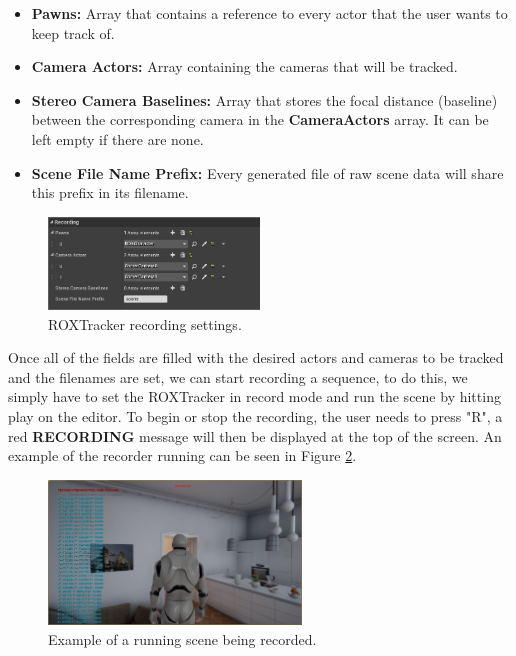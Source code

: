 \begin{itemize}
	\item \textbf{Pawns:} Array that contains a reference to every actor that the user wants to keep track of.
	\item \textbf{Camera Actors:} Array containing the cameras that will be tracked.
	\item \textbf{Stereo Camera Baselines:} Array that stores the focal distance (baseline) between the corresponding camera in the \textbf{CameraActors} array. It can be left empty if there are none.
	\item \textbf{Scene File Name Prefix:} Every generated file of raw scene data will share this prefix in its filename.
\end{itemize}

\begin{figure}[!ht]
	\includegraphics[width=0.5\textwidth]{archivos/recording_settings.png}
	\centering
	\caption{ROXTracker recording settings.}
	\label{fig:recording_settings}
\end{figure}

Once all of the fields are filled with the desired actors and cameras to be tracked and the filenames are set, we can start recording a sequence, to do this, we simply have to set the ROXTracker in record mode and run the scene by hitting play on the editor. To begin or stop the recording, the user needs to press "R", a red \textbf{RECORDING} message will then be displayed at the top of the screen. An example of the recorder running can be seen in Figure \ref{fig:recording}.

\begin{figure}[!ht]
	\includegraphics[width=0.6\textwidth]{archivos/recording.png}
	\centering
	\caption{Example of a running scene being recorded.}
	\label{fig:recording}
\end{figure}

